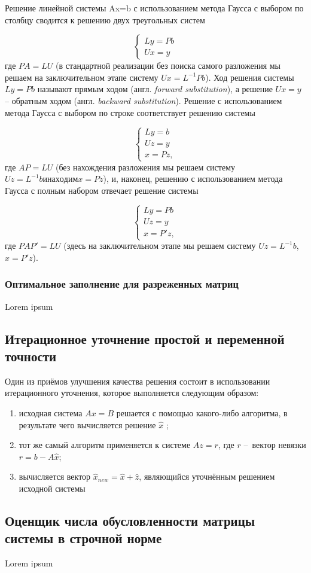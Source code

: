 Решение линейной системы Ax=b с использованием метода Гаусса с выбором по столбцу сводится к решению двух треугольных систем

\[
\begin{cases}
     Ly=Pb   \\
     Ux=y    
\end{cases}
\]
где $PA=LU$ (в стандартной реализации без поиска самого разложения мы решаем на заключительном этапе систему $Ux=L^{-1}Pb$). Ход решения системы $Ly=Pb$ называют прямым ходом (англ. \textit{forward substitution}), а решение $Ux=y$ – обратным ходом (англ. \textit{backward substitution}).
Решение с использованием метода Гаусса с выбором по строке соответствует решению системы

\[
\begin{cases}
	Ly = b \\
	Uz = y \\
	x = Pz,
\end{cases}
\] 
где $AP=LU$ (без нахождения разложения мы решаем систему $Uz=L^{-1}b и находим x=Pz$), и, наконец, решению с использованием метода Гаусса с полным набором отвечает решение системы 

\[
\begin{cases}
	Ly = Pb \\
	Uz = y  \\
	x = P'z,
\end{cases}
\] 
где $PAP'=LU$ (здесь на заключительном этапе мы решаем систему $Uz = L^{-1}b$, $x=P'z$). 


\subsubsection{Оптимальное заполнение для разреженных матриц}

Lorem ipsum 


\subsection{Итерационное уточнение простой и переменной точности}

Один из приёмов улучшения качества решения состоит в использовании итерационного уточнения, которое выполняется следующим образом:

\begin{enumerate}
	\item исходная система $Ax=B$ решается с помощью какого-либо алгоритма, в результате чего вычисляется решение $\hat{x}$ ;
	\item тот же самый алгоритм применяется к системе $Az=r$, где $r$ – вектор невязки $r=b-A\hat{x}$;
	\item вычисляется вектор $\hat{x}_{new} = \hat{x} + \hat{z}$, являющийся уточнённым решением исходной системы
\end{enumerate}


\subsection{Оценщик числа обусловленности матрицы системы в строчной норме}

Lorem ipsum

